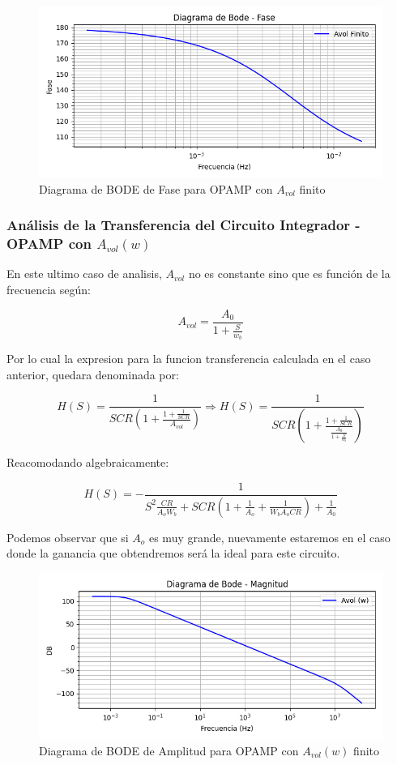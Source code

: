 \begin{figure}[H]
    \centering 
    \includegraphics [scale=1] {../Ejercicio3-CircuitoIntegradoresyDerivadores/Imagenes/diagrama-bode-cideal-fase.png} 
    \caption{Diagrama de BODE de Fase para OPAMP con $A_{vol}$ finito}
    \label{fig:emptyPlotTool}
\end{figure}

\subsubsection{Análisis de la Transferencia del Circuito Integrador - OPAMP con $A_{vol}(w)$}

En este ultimo caso de analisis, $A_{vol}$ no es constante sino que es función de la frecuencia según:

$$A_{vol}=\frac{A_0}{1+\frac{S}{w_b}}$$

Por lo cual la expresion para la funcion transferencia calculada en el caso anterior, quedara denominada por:

$$H(S)= \frac{1}{SCR(1+\frac{1+\frac{1}{SCR}}{A_{vol}})}\Longrightarrow H(S)= \frac{1}{SCR(1+\frac{1+\frac{1}{SCR}}{\frac{A_0}{1+\frac{S}{w_b}}})}$$ 

Reacomodando algebraicamente:

$$H(S)=- \frac{1}{S^2\frac{CR}{A_oW_b}+SCR(1 + \frac{1}{A_o}+\frac{1}{W_bA_oCR}) + \frac{1}{A_0}}$$

Podemos observar que si $A_o$ es muy grande, nuevamente estaremos en el caso donde la ganancia que obtendremos será la ideal para este circuito.

\begin{figure}[H]
    \centering 
    \includegraphics [scale=1] {../Ejercicio3-CircuitoIntegradoresyDerivadores/Imagenes/diagrama-bode-noideal-amplitud.png} 
    \caption{Diagrama de BODE de Amplitud para OPAMP con $A_{vol}(w)$ finito}
    \label{fig:emptyPlotTool}
\end{figure}

